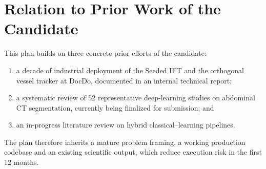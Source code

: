 \documentclass[a4paper,11pt,twoside]{article}
\begin{document}
\section{Relation to Prior Work of the Candidate}

This plan builds on three concrete prior efforts of the candidate:
\begin{enumerate}[label=(\roman*), noitemsep, topsep=3pt]
  \item a decade of industrial deployment of the Seeded IFT and the orthogonal
        vessel tracker at DocDo, documented in an internal technical report;
  \item a systematic review of 52 representative deep-learning studies on
        abdominal CT segmentation, currently being finalized for submission; and
  \item an in-progress literature review on hybrid classical--learning pipelines.
\end{enumerate}
The plan therefore inherits a mature problem framing, a working production
codebase and an existing scientific output, which reduce execution risk in
the first 12 months.
\end{document}
